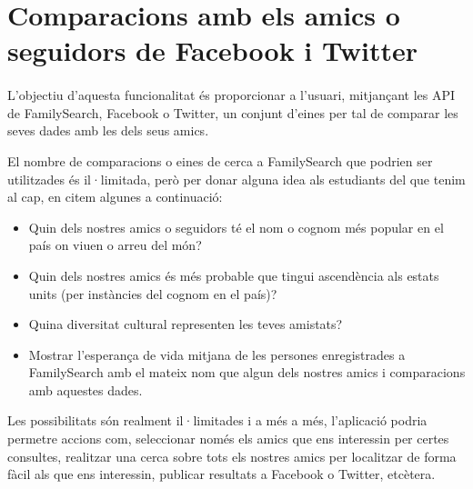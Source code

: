 \section{Comparacions amb els amics o seguidors de Facebook i Twitter}

    \paragraph{}
    L'objectiu d'aquesta funcionalitat és proporcionar a l'usuari, mitjançant les API de FamilySearch, Facebook o Twitter, un conjunt d'eines per tal de comparar les seves dades amb les dels seus amics.

    El nombre de comparacions o eines de cerca a FamilySearch que podrien ser utilitzades és il·limitada, però per donar alguna idea als estudiants del que tenim al cap, en citem algunes a continuació:

    \begin{itemize}
        \item Quin dels nostres amics o seguidors té el nom o cognom més popular en el país on viuen o arreu del món?
        \item Quin dels nostres amics és més probable que tingui ascendència als estats units (per instàncies del cognom en el país)?
        \item Quina diversitat cultural representen les teves amistats?
        \item Mostrar l'esperança de vida mitjana de les persones enregistrades a FamilySearch amb el mateix nom que algun dels nostres amics i comparacions amb aquestes dades.
    \end{itemize}

    Les possibilitats són realment il·limitades i a més a més, l'aplicació podria permetre accions com, seleccionar només els amics que ens interessin per certes consultes, realitzar una cerca sobre tots els nostres amics per localitzar de forma fàcil als que ens interessin, publicar resultats a Facebook o Twitter, etcètera. 
